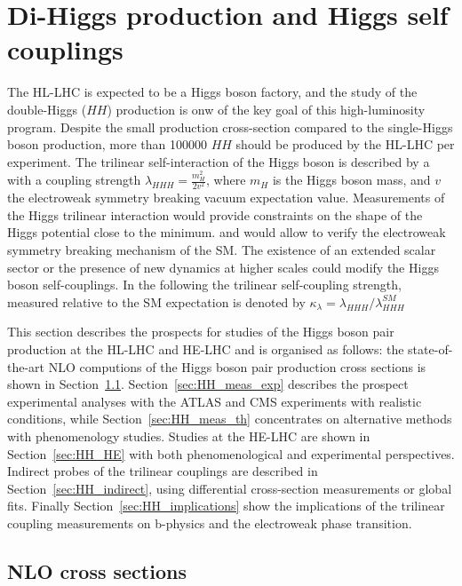 \documentclass[../report.tex]{subfiles}
\begin{document}
\section{Di-Higgs production and Higgs self couplings\label{sec3:HH}}

The HL-LHC is expected to be a Higgs boson factory, and the study of the double-Higgs ($HH$) production is onw of the key goal of this high-luminosity program. Despite the small production cross-section compared to the single-Higgs boson production, more than 100000 $HH$ should be produced by the HL-LHC per experiment. The trilinear self-interaction of the Higgs boson is described by a with a coupling strength $\lambda_{HHH}  = \frac{m_H^2}{2v^2} $, where $m_H$ is the Higgs boson mass, and $v$ the electroweak symmetry breaking vacuum expectation value. Measurements of the Higgs trilinear interaction would provide constraints on the shape of the Higgs potential close to the minimum. and would allow to verify the electroweak symmetry breaking mechanism of the SM.
The existence of an extended scalar sector or the presence of new dynamics at higher scales could modify the Higgs boson self-couplings.
In the following the trilinear self-coupling strength, measured relative to the SM expectation is denoted by $\kappa_{\lambda} = \lambda_{HHH}/\lambda_{HHH}^{SM}$

This section describes the prospects for studies of the Higgs boson pair production at the HL-LHC and HE-LHC and is organised as follows: the state-of-the-art NLO computions of the Higgs boson pair production cross sections is shown in Section~\ref{sec:HH_NLO}. Section~\ref{sec:HH_meas_exp} describes the prospect experimental analyses with the ATLAS and CMS experiments with realistic conditions, while Section~\ref{sec:HH_meas_th} concentrates on alternative methods with phenomenology studies. Studies at the HE-LHC are shown in Section~\ref{sec:HH_HE} with both phenomenological and experimental perspectives. Indirect probes of the trilinear couplings are described in Section~\ref{sec:HH_indirect}, using differential cross-section measurements or global fits. Finally Section~\ref{sec:HH_implications} show the implications of the trilinear coupling measurements on b-physics and the electroweak phase transition.  

\subsection{NLO cross sections}
\label{sec:HH_NLO}
\end{document}
